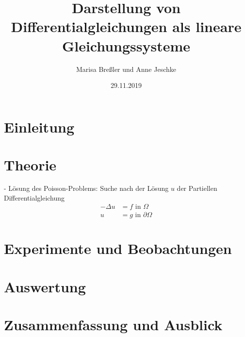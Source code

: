 \documentclass{scrartcl}
\begin{document}
\title{Darstellung von Differentialgleichungen als lineare Gleichungssysteme}
\author{Marisa Breßler und Anne Jeschke}
\date{29.11.2019}
\maketitle

\tableofcontents

\pagebreak \section{Einleitung}
\label{sec:einleitung}

\pagebreak \section{Theorie}
\label{sec:theorie}
- Lösung des Poisson-Problems: Suche nach der Lösung $u$ der Partiellen Differentialgleichung
\[\begin{split}
-\Delta u &= f \textrm{ in } \Omega\\
        u &= g \textrm{ in } \partial\Omega
\end{split}
\]

\pagebreak \section{Experimente und Beobachtungen}
\label{sec:experimente}


\pagebreak \section{Auswertung}
\label{sec:auswertung}

\pagebreak \section{Zusammenfassung und Ausblick}
\label{sec:zusammenfassung}

\pagebreak


\end{document}
